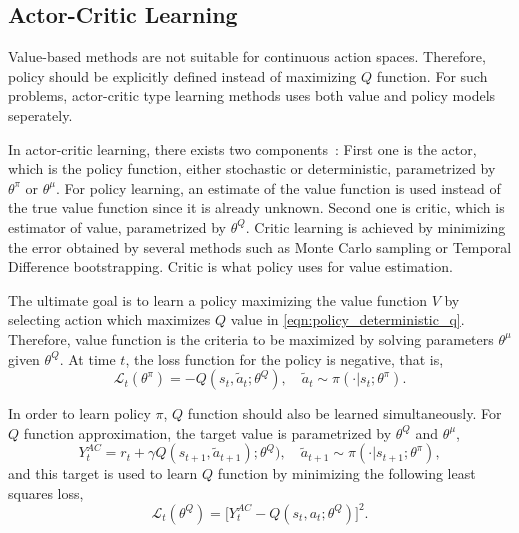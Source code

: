 \subsection{Actor-Critic Learning}

Value-based methods are not suitable for continuous action spaces. 
Therefore, policy should be explicitly defined instead of maximizing $Q$ function. 
For such problems, actor-critic type learning methods uses both value and policy models seperately. 

In actor-critic learning, there exists two components~\cite{silver_deterministic_2014}:  
First one is the actor, which is the policy function, either stochastic or deterministic, parametrized by $\theta^{\pi}$ or $\theta^{\mu}$. 
For policy learning, an estimate of the value function is used instead of the true value function since it is already unknown. 
Second one is critic, which is estimator of value, parametrized by $\theta^Q$. 
Critic learning is achieved by minimizing the error obtained by several methods such as Monte Carlo sampling or Temporal Difference bootstrapping.
Critic is what policy uses for value estimation. 

The ultimate goal is to learn a policy maximizing the value function $V$ by selecting action which maximizes $Q$ value in \eqref{eqn:policy_deterministic_q}. 
Therefore, value function is the criteria to be maximized by solving parameters $\theta^\mu$ given $\theta^Q$. At time $t$, the loss function for the policy is negative, that is,  
\begin{equation}
\label{eqn:ac_value_maximization}
\mathcal{L}_t(\theta^\pi) = - Q(s_t, \widetilde{a}_t;\theta^Q), \quad \widetilde{a}_t \sim \pi(\cdot|s_t;\theta^\pi).
\end{equation}

In order to learn policy $\pi$, $Q$ function should also be learned simultaneously. 
For $Q$ function approximation, the target value is parametrized by $\theta^Q$ and $\theta^\mu$,
\begin{equation}
\label{eqn:ac_target}
Y_t^{AC} = r_t + \gamma Q(s_{t+1}, \widetilde{a}_{t+1});\theta^Q), \quad \widetilde{a}_{t+1} \sim \pi(\cdot|s_{t+1};\theta^{\pi}),
\end{equation}
and this target is used to learn $Q$ function by minimizing the following least squares loss,
\begin{equation}
\label{eqn:ac_loss}
\mathcal{L}_t(\theta^Q) = \big[ Y_t^{AC} - Q(s_t,a_t;\theta^Q) \big] ^ 2.
\end{equation}

